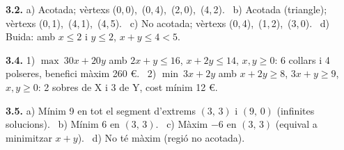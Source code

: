 \documentclass[11pt,a4paper]{article}
\begin{document}
\textbf{3.2.} a) Acotada; vèrtexs (0,\,0),\ (0,\,4),\ (2,\,0),\ (4,\,2). \ b) Acotada (triangle); vèrtexs (0,\,1),\ (4,\,1),\ (4,\,5). \ c) No acotada; vèrtexs (0,\,4),\ (1,\,2),\ (3,\,0). \ d) Buida: amb $x\leq2$ i $y\leq2$, $x+y\leq4<5$.

\textbf{3.4.} 1) $\max\ 30x+20y$ amb $2x+y\leq16$, $x+2y\leq14$, $x,y\geq0$: 6 collars i 4 polseres, benefici màxim 260 €. \ 2) $\min\ 3x+2y$ amb $x+2y\geq8$, $3x+y\geq9$, $x,y\geq0$: 2 sobres de X i 3 de Y, cost mínim 12 €.

\textbf{3.5.} a) Mínim 9 en tot el segment d'extrems $(3,\,3)$ i $(9,\,0)$ (infinites solucions). \ b) Mínim 6 en $(3,\,3)$. \ c) Màxim $-6$ en $(3,\,3)$ (equival a minimitzar $x+y$). \ d) No té màxim (regió no acotada).
\normalsize
\end{document}
